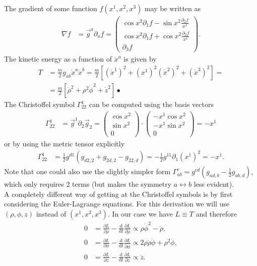 \documentclass[english, parskip=full]{scrartcl}
\newcommand{\kla}{}
\newcommand{\klam}{}
\newcommand{\tecxt}{}
\begin{document}
The gradient of some function $f(x^1,x^2,x^3)$ may be written as
\begin{align}
\nabla f &= \vec{g}^a\partial_a f = \begin{pmatrix}
\cos x^2\partial_1f-\sin x^2\frac{\partial_2f}{x^1}\\ \cos x^2\partial_1f + \cos x^2\frac{\partial_2f}{x^1} \\ \partial_3f
\end{pmatrix}. \label{eqn:zylinder:Gradient}
\end{align}
The kinetic energy as a function of $\dot{x}^a$ is given by
\begin{align}
T &= \frac{m}{2}g_{ab}\dot{x}^a\dot{x}^b = \frac{m}{2}\kla\left[ {(\dot{x}^1)^2 + (x^1)^2(\dot{x}^2)^2 + (\dot{x}^3)^2} \right] = \\
&= \frac{m}{2} \klam\left[ \dot{\rho}^2 + \rho^2\dot{\phi}^2 + \dot{z}^2 \right]• \label{eqn:zylinder:Kinetische Energie}
\end{align}
The Christoffel symbol $\Gamma_{22}^1$ can be computed using the basis vectors
\begin{align}
\Gamma_{22}^1 &= \vec{g}^1\partial_2\vec{g}_2 = \begin{pmatrix}
\cos x^2 \\ \sin x^2 \\ 0
\end{pmatrix} \cdot \begin{pmatrix}
-x^1\cos x^2 \\ -x^1\sin x^2 \\ 0
\end{pmatrix} = -x^1
\end{align}
or by using the metric tensor explicitly
\begin{align}
\Gamma_{22}^1 &= \frac{1}{2}g^{d1}\kla\left( {g_{d2,2}+g_{2d,2}-g_{22,d}} \right) = -\frac{1}{2}g^{11}\partial_1(x^1)^2 = -x^1.
\end{align}
Note that one could also use the slightly simpler form $\Gamma^c_{ab} = g^{cd}\kla\left( g_{ad,b} - \frac{1}{2}g_{ab,d} \right)$, which only requires 2 terms (but makes the symmetry $a\leftrightarrow b$ less evident).
\\
A completely different way of getting at the Christoffel symbols is by first considering the Euler-Lagrange equations.
For this derivation we will use $(\rho,\phi,z)$ instead of $(x^1,x^2,x^3)$.
In our case we have $L\equiv T$ and therefore
\begin{align}
0 &= \frac{\partial L}{\partial \rho} - \frac{\tecxt\text{d}}{\tecxt\text{d}t} \frac{\partial L}{\partial \dot{\rho}} \propto \rho\dot{\phi}^2 - \ddot{\rho},\\
0 &= \frac{\partial L}{\partial \phi} - \frac{\tecxt\text{d}}{\tecxt\text{d}t} \frac{\partial L}{\partial \dot{\phi}} \propto 2\rho\dot{\rho}\dot{\phi} + \rho^2\ddot{\phi},\\
0 &= \frac{\partial L}{\partial z} - \frac{\tecxt\text{d}}{\tecxt\text{d}t} \frac{\partial L}{\partial \dot{z}} \propto \ddot{z}.
\end{align}
\end{document}
